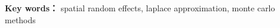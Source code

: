 
\medskip
\par

{\bf Key words：} spatial random effects, laplace approximation, monte carlo methods

\newpage 
\mbox{} 

